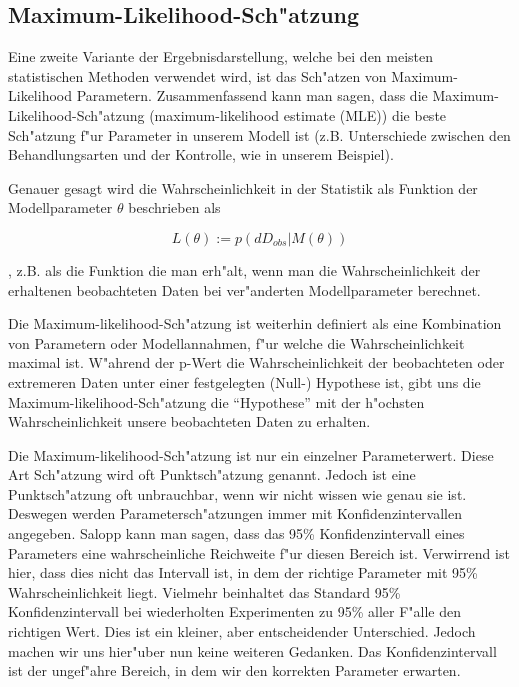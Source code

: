 \documentclass[a4paper,twoside]{tufte-book}\usepackage[]{graphicx}\usepackage[]{color}
\begin{document}
\subsection{Maximum-Likelihood-Sch"atzung}

Eine zweite Variante der Ergebnisdarstellung, welche bei den meisten statistischen Methoden verwendet wird, ist das Sch"atzen von Maximum-Likelihood Parametern. Zusammenfassend kann man sagen, dass die Maximum-Likelihood-Sch"atzung (maximum-likelihood estimate (MLE)) die beste Sch"atzung f"ur Parameter in unserem Modell ist (z.B. Unterschiede zwischen den Behandlungsarten und der Kontrolle, wie in unserem Beispiel).


Genauer gesagt wird die Wahrscheinlichkeit in der Statistik als Funktion der Modellparameter $\theta$ beschrieben als

\begin{equation}
L(\theta) := p(dD_{obs} | M(\theta))
\end{equation}

, z.B. als die Funktion die man erh"alt, wenn man die Wahrscheinlichkeit der erhaltenen beobachteten Daten bei ver"anderten Modellparameter berechnet.

Die Maximum-likelihood-Sch"atzung ist weiterhin definiert als eine Kombination von Parametern oder Modellannahmen, f"ur welche die Wahrscheinlichkeit maximal ist. W"ahrend der p-Wert die Wahrscheinlichkeit der beobachteten 
oder extremeren Daten unter einer festgelegten (Null-) Hypothese ist, gibt uns die Maximum-likelihood-Sch"atzung die "`Hypothese"' mit der h"ochsten Wahrscheinlichkeit unsere beobachteten Daten zu erhalten.

Die Maximum-likelihood-Sch"atzung ist nur ein einzelner Parameterwert. Diese Art Sch"atzung wird oft Punktsch"atzung genannt. Jedoch ist eine Punktsch"atzung oft unbrauchbar, wenn wir nicht wissen wie genau sie ist. Deswegen werden Parametersch"atzungen immer mit Konfidenzintervallen angegeben. Salopp kann man sagen, dass das 95\% Konfidenzintervall eines Parameters eine wahrscheinliche Reichweite f"ur diesen Bereich ist. Verwirrend ist hier, dass dies nicht das Intervall ist, in dem der richtige Parameter mit 95\% Wahrscheinlichkeit liegt. Vielmehr beinhaltet das Standard 95\% Konfidenzintervall bei wiederholten Experimenten zu 95\% aller F"alle den richtigen Wert. Dies ist ein kleiner, aber entscheidender Unterschied. Jedoch machen wir uns hier"uber nun keine weiteren Gedanken. Das Konfidenzintervall ist der ungef"ahre Bereich, in dem wir den korrekten Parameter erwarten. 
\end{document}
